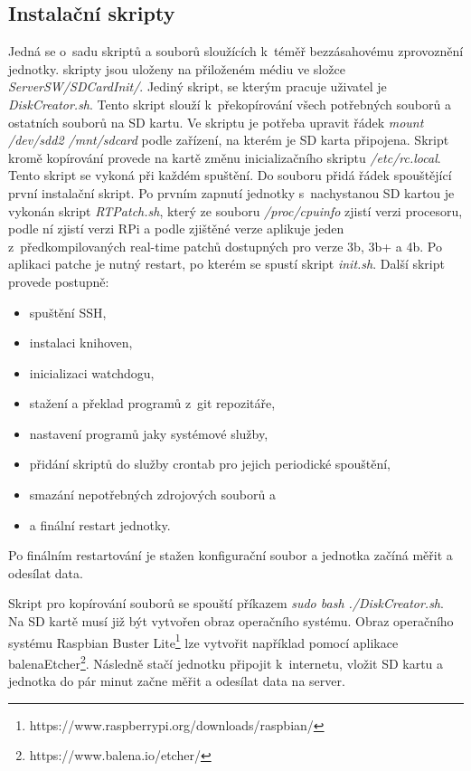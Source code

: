 \subsection{Instalační skripty}
Jedná se o~sadu skriptů a souborů sloužících k~téměř bezzásahovému zprovoznění jednotky. skripty jsou uloženy na přiloženém médiu ve složce \textit{ServerSW/SDCardInit/}. Jediný skript, se kterým pracuje uživatel je \textit{DiskCreator.sh}. Tento skript slouží k~překopírování všech potřebných souborů a ostatních souborů na SD kartu. Ve skriptu je potřeba upravit řádek \textit{mount /dev/sdd2 /mnt/sdcard} podle zařízení, na kterém je SD karta připojena. Skript kromě kopírování provede na kartě změnu inicializačního skriptu \textit{/etc/rc.local}. Tento skript se vykoná při každém spuštění. Do souboru přidá řádek spouštějící první instalační skript. Po prvním zapnutí jednotky s~nachystanou SD kartou je vykonán skript \textit{RTPatch.sh}, který ze souboru \textit{/proc/cpuinfo} zjistí verzi procesoru, podle ní zjistí verzi RPi a podle zjištěné verze aplikuje jeden z~předkompilovaných real-time patchů dostupných pro verze 3b, 3b+ a 4b. Po aplikaci patche je nutný restart, po kterém se spustí skript \textit{init.sh}. Další skript provede postupně:
\begin{itemize}
    \item spuštění SSH,
    \item instalaci knihoven,
    \item inicializaci watchdogu,
    \item stažení a překlad programů z~git repozitáře,
    \item nastavení programů jaky systémové služby,
    \item přidání skriptů do služby crontab pro jejich periodické spouštění,
    \item smazání nepotřebných zdrojových souborů a
    \item a finální restart jednotky.
\end{itemize}
Po finálním restartování je stažen konfigurační soubor a jednotka začíná měřit a odesílat data.

Skript pro kopírování souborů se spouští příkazem \textit{sudo bash ./DiskCreator.sh}. Na SD kartě musí již být vytvořen obraz operačního systému. Obraz operačního systému Raspbian Buster Lite\footnote{https://www.raspberrypi.org/downloads/raspbian/} lze vytvořit například pomocí aplikace balenaEtcher\footnote{https://www.balena.io/etcher/}. Následně stačí jednotku připojit k~internetu, vložit SD kartu a jednotka do pár minut začne měřit a odesílat data na server. 

